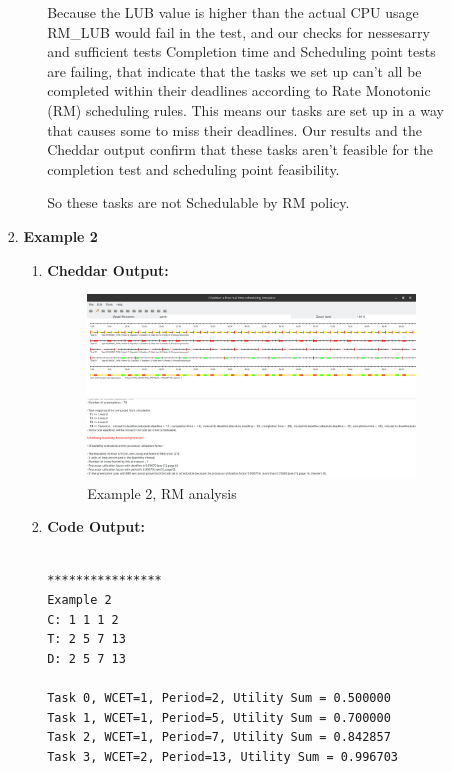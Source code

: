 \documentclass[a4paper,11pt]{article}%
\newenvironment{qanda}{\setlength{\parindent}{0pt}}{\bigskip}
\begin{document}
\begin{qanda}
\begin{enumerate}
\begin{enumerate}
\begin{enumerate}
\begin{enumerate}
						                  Because the LUB value is higher than the actual CPU usage RM\_LUB would fail in the test, and our checks for nessesarry and sufficient tests Completion time and Scheduling point tests are failing, that indicate that the tasks we set up can't all be completed within their deadlines according to Rate Monotonic (RM) scheduling rules. This means our tasks are set up in a way that causes some to miss their deadlines. Our results and the Cheddar output confirm that these tasks aren't feasible for the completion test and scheduling point feasibility.

						                  So these tasks are not Schedulable by RM policy.

					            \end{enumerate}
					      \item \textbf{Example 2}
					            \begin{enumerate}
						            \item \textbf{Cheddar Output:}\\
						                  \begin{figure}[H]
							                  \centering
							                  \includegraphics[scale=0.36]{figures/ex2_rm.png}
							                  \caption{Example 2, RM analysis}
						                  \end{figure}
						            \item \textbf{Code Output:}\\\\
						                  \begin{verbatim}
****************
Example 2
C: 1 1 1 2
T: 2 5 7 13
D: 2 5 7 13

Task 0, WCET=1, Period=2, Utility Sum = 0.500000
Task 1, WCET=1, Period=5, Utility Sum = 0.700000
Task 2, WCET=1, Period=7, Utility Sum = 0.842857
Task 3, WCET=2, Period=13, Utility Sum = 0.996703


\end{verbatim}
\end{enumerate}
\end{enumerate}
\end{enumerate}
\end{enumerate}
\end{qanda}
\end{document}
